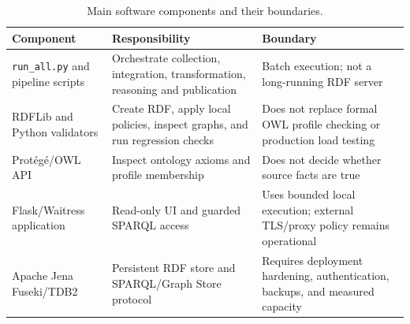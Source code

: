 \begin{table}[htbp]\centering\small
\caption{Main software components and their boundaries.}\label{tab:software-components}
\begin{tabularx}{\textwidth}{p{3.2cm}p{4.2cm}X}\toprule
Component & Responsibility & Boundary \\\midrule
\texttt{run\_all.py} and pipeline scripts & Orchestrate collection, integration, transformation, reasoning and publication & Batch execution; not a long-running RDF server \\
RDFLib and Python validators & Create RDF, apply local policies, inspect graphs, and run regression checks & Does not replace formal OWL profile checking or production load testing \\
Protégé/OWL API & Inspect ontology axioms and profile membership & Does not decide whether source facts are true \\
Flask/Waitress application & Read-only UI and guarded SPARQL access & Uses bounded local execution; external TLS/proxy policy remains operational \\
Apache Jena Fuseki/TDB2 & Persistent RDF store and SPARQL/Graph Store protocol & Requires deployment hardening, authentication, backups, and measured capacity \\
\bottomrule
\end{tabularx}
\end{table}
